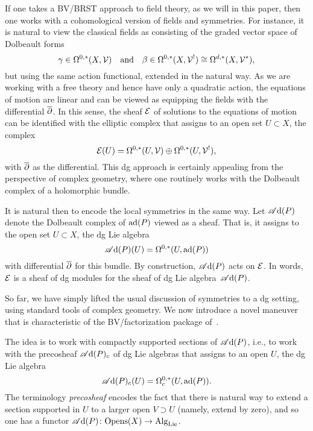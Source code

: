 If one takes a BV/BRST approach to field theory, as we will in this paper,
then one works with a cohomological version of fields and symmetries.
For instance, it is natural to view the classical fields as consisting of the graded vector space of Dolbeault forms
\[
\gamma \in \Omega^{0,*}(X,\mathcal{V}) \quad \text{and} \quad \beta \in \Omega^{0,*}(X, \mathcal{V}^!) \cong \Omega^{d,*}(X, \mathcal{V}^*),
\]
but using the same action functional, extended in the natural way.
As we are working with a free theory and hence have only a quadratic action,
the equations of motion are linear and can be viewed as equipping the fields with the differential $\overline{\partial}$.
In this sense, the sheaf $\mathcal E$ of solutions to the equations of motion can be identified with the elliptic complex that assigns to an open set $U \subset X$, the complex
\[
\mathcal E(U) = \Omega^{0,*}(U,\mathcal{V}) \oplus \Omega^{0,*}(U, \mathcal{V}^!),
\]
with $\overline{\partial}$ as the differential.
This dg approach is certainly appealing from the perspective of complex geometry,
where one routinely works with the Dolbeault complex of a holomorphic bundle.

It is natural then to encode the local symmetries in the same way.
Let $\mathscr A{\rm d}(P)$ denote the Dolbeault complex of ${\rm ad}(P)$ viewed as a sheaf.
That is, it assigns to the open set $U \subset X$, the dg Lie algebra 
\[
\mathscr A{\rm d}(P)(U) = \Omega^{0,*}(U,{\rm ad}(P))
\]
with differential $\overline{\partial}$ for this bundle.
By construction, $\mathscr A{\rm d}(P)$ acts on $\mathcal E$.
In words, $\mathcal E$ is a sheaf of dg modules for the sheaf of dg Lie algebra~$\mathscr A{\rm d}(P)$.

So far, we have simply lifted the usual discussion of symmetries to a dg setting,
using standard tools of complex geometry.
We now introduce a novel maneuver that is characteristic of the BV/factorization package of~\cite{CG1,CG2}.

The idea is to work with compactly supported sections of $\mathscr A{\rm d}(P)$, 
i.e., to work with the precosheaf $\mathscr A{\rm d}(P)_c$ of dg Lie algebras that assigns to an open $U$,
the dg Lie algebra
\[
\mathscr A{\rm d}(P)_c(U) = \Omega^{0,*}_c(U,{\rm ad}(P)).
\]
The terminology {\em precosheaf} encodes the fact that there is natural way to extend a section supported in $U$ to a larger open $V \supset U$ (namely, extend by zero),
and so one has a functor $\mathscr A{\rm d}(P) \colon {\rm Opens}(X) \to {\rm Alg}_{\rm Lie}$.


